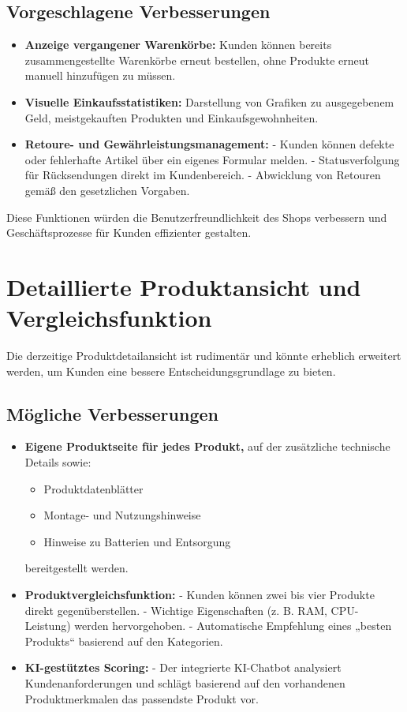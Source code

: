 \documentclass[%
	12pt,
	a4paper,
	oneside,
	parskip=full
]{scrbook}
\begin{document}
\subsection{Vorgeschlagene Verbesserungen}
\begin{itemize}
	\item \textbf{Anzeige vergangener Warenkörbe:} Kunden können bereits zusammengestellte Warenkörbe erneut bestellen, ohne Produkte erneut manuell hinzufügen zu müssen.
	\item \textbf{Visuelle Einkaufsstatistiken:} Darstellung von Grafiken zu ausgegebenem Geld, meistgekauften Produkten und Einkaufsgewohnheiten.
	\item \textbf{Retoure- und Gewährleistungsmanagement:}  
	- Kunden können defekte oder fehlerhafte Artikel über ein eigenes Formular melden.  
	- Statusverfolgung für Rücksendungen direkt im Kundenbereich.  
	- Abwicklung von Retouren gemäß den gesetzlichen Vorgaben.
\end{itemize}

Diese Funktionen würden die Benutzerfreundlichkeit des Shops verbessern und Geschäftsprozesse für Kunden effizienter gestalten.

\section{Detaillierte Produktansicht und Vergleichsfunktion}

Die derzeitige Produktdetailansicht ist rudimentär und könnte erheblich erweitert werden, um Kunden eine bessere Entscheidungsgrundlage zu bieten.

\subsection{Mögliche Verbesserungen}
\begin{itemize}
	\item \textbf{Eigene Produktseite für jedes Produkt,} auf der zusätzliche technische Details sowie:
	\begin{itemize}
		\item Produktdatenblätter
		\item Montage- und Nutzungshinweise
		\item Hinweise zu Batterien und Entsorgung
	\end{itemize}
	bereitgestellt werden.
	\item \textbf{Produktvergleichsfunktion:}  
	- Kunden können zwei bis vier Produkte direkt gegenüberstellen.  
	- Wichtige Eigenschaften (z. B. RAM, CPU-Leistung) werden hervorgehoben.  
	- Automatische Empfehlung eines „besten Produkts“ basierend auf den Kategorien.  
	\item \textbf{KI-gestütztes Scoring:}  
	- Der integrierte KI-Chatbot analysiert Kundenanforderungen und schlägt basierend auf den vorhandenen Produktmerkmalen das passendste Produkt vor.
\end{itemize}
\end{document}
